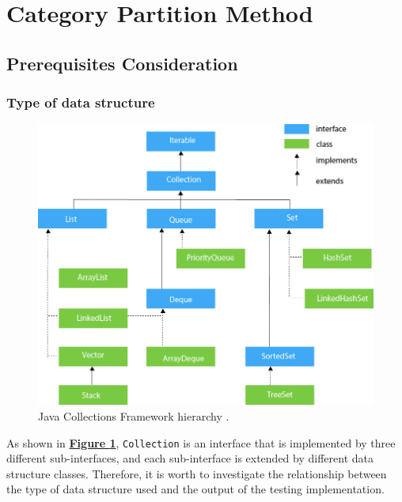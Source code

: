 \documentclass[12pt, a4paper]{article}
\begin{document}
\section{Category Partition Method}
\subsection{Prerequisites Consideration}
\subsubsection{Type of data structure}
\begin{figure}[H]
  \centering
  \includegraphics[width=.75\textwidth]{images/java-collection-hierarchy.png}
  \caption{Java Collections Framework hierarchy \cite{java_collection_hierarchy}.}
  \label{figure:collection_hierarchy}
\end{figure}

As shown in \hyperref[figure:collection_hierarchy]{\textbf{Figure
\ref*{figure:collection_hierarchy}}}, \texttt{Collection} is an interface that is implemented by
three different sub-interfaces, and each sub-interface is extended by different data structure
classes. Therefore, it is worth to investigate the relationship between the type of data structure
used and the output of the testing implementation.
\end{document}

